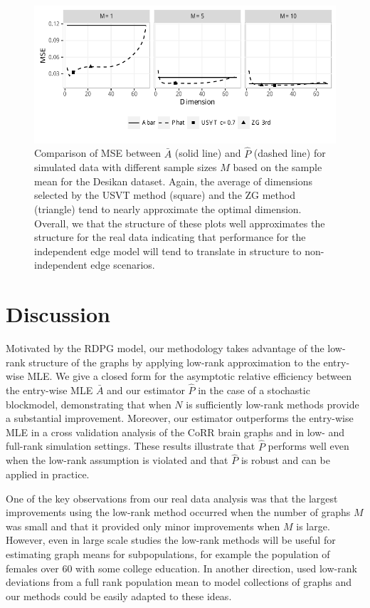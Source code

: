 \documentclass[10pt,letterpaper]{article}
\begin{document}
\begin{figure}[!htb]
\centering
\includegraphics[width=1\textwidth]{sim_desikan.pdf}
\caption{Comparison of MSE between $\bar{A}$ (solid line) and $\hat{P}$ (dashed line) for simulated data with different sample sizes $M$ based on the sample mean for the Desikan dataset. Again, the average of dimensions selected by the USVT method (square) and the ZG method (triangle) tend to nearly approximate the optimal dimension. 
Overall, we that the structure of these plots well approximates the structure for the real data indicating that performance for the independent edge model will tend to translate in structure to non-independent edge scenarios.}
\label{fig:sim_desikan}
\end{figure}



\section{Discussion}

Motivated by the RDPG model, our methodology takes advantage of the low-rank structure of the graphs by applying low-rank approximation to the entry-wise MLE. 
We give a closed form for the asymptotic relative efficiency between the entry-wise MLE $\bar{A}$ and our estimator $\hat{P}$ in the case of a stochastic blockmodel, demonstrating that when $N$ is sufficiently low-rank methods provide a substantial improvement.
Moreover, our estimator outperforms the entry-wise MLE in a cross validation analysis of the CoRR brain graphs and in low- and full-rank simulation settings.
These results illustrate that $\hat{P}$ performs well even when the low-rank assumption is violated and that $\hat{P}$ is robust and can be applied in practice.

One of the key observations from our real data analysis was that the largest improvements using the low-rank method occurred when the number of graphs $M$ was small and that it provided only minor improvements when $M$ is large. 
However, even in large scale studies the low-rank methods will be useful for estimating graph means for subpopulations, for example the population of females over 60 with some college education.
In another direction, \citet{durante2014nonparametric} used low-rank deviations from a full rank population mean to model collections of graphs and our methods could be easily adapted to these ideas.
\end{document}
